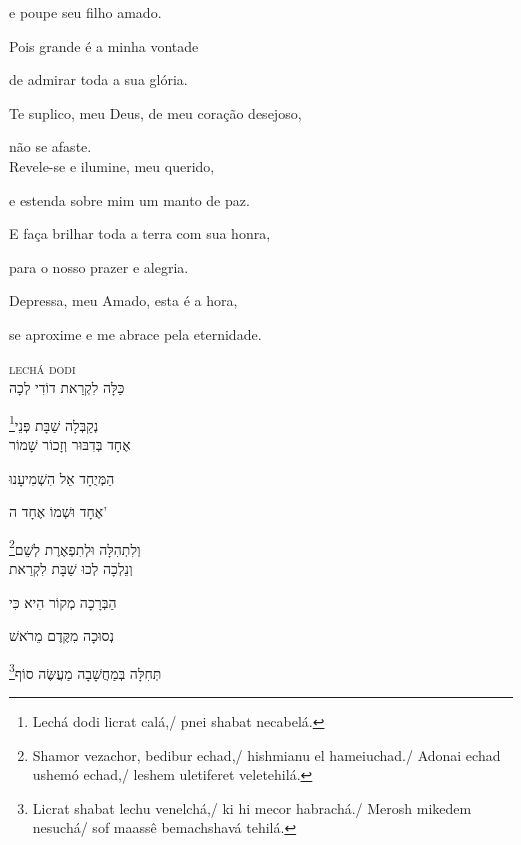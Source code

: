 e poupe seu filho amado.

Pois grande é a minha vontade

de admirar toda a sua glória.

Te suplico, meu Deus, de meu coração desejoso,

não se afaste.\\[10pt]

Revele-se e ilumine, meu querido,

e estenda sobre mim um manto de paz.

E faça brilhar toda a terra com sua honra,

para o nosso prazer e alegria.

Depressa, meu Amado, esta é a hora,

se aproxime e me abrace pela eternidade.

%


%



\movetoevenpage
\raggedleft
{}

\vspace*{1cm}

\textsc{lechá dodi}\\[15pt]

כַּלָּה לִקְרַאת דוֹדִי לְכָה

\footnote{Lechá dodi licrat calá,/ pnei shabat necabelá.}נְקַבְּלָה שַׁבָּת פְּנֵי\\[10pt]

אֶחָד בְּדִבּוּר וְזָכוֹר שָׁמוֹר

הַמְּיֻחָד אֵל הִשְׁמִיעָנוּ

אֶחָד וּשְׁמוֹ אֶחָד ה' 

\footnote{Shamor vezachor, bedibur echad,/ hishmianu el hameiuchad./ Adonai echad ushemó echad,/ leshem uletiferet veletehilá.}וְלִתְהִלָּה וּלְתִפְאֶרֶת לְשֵׁם\\[10pt]

וְנֵלְכָה לְכוּ שַׁבָּת לִקְרַאת

הַבְּרָכָה מְקוֹר הִיא כִּי

נְסוּכָה מִקֶּדֶם מֵרֹאשׁ 

\footnote{Licrat shabat lechu venelchá,/ ki hi mecor habrachá./ Merosh mikedem nesuchá/ sof maassê bemachshavá tehilá.}תְּחִלָּה בְּמַחֲשָׁבָה מַעֲשֶּׂה סוֹף\\[10pt]

